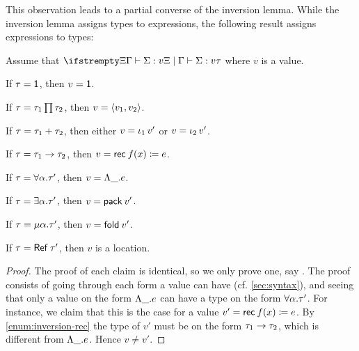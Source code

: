 This observation leads to a partial converse of the inversion lemma. While the inversion lemma assigns types to expressions, the following result assigns expressions to types:

\begin{lemma}
    \label{lem:canonical}
    Assume that $\typerel{\Xi}{\Gamma}{\Sigma}{v}{\tau}$ where $v$ is a value.
    \begin{enumlemma}[left=0.2cm] %
        \item\label{enum:canonical-unit} If $\tau = \mathsf{1}$, then $v = \mathsf{1}$.

        \item\label{enum:canonical-product} If $\tau = \typeProd{\tau_1}{\tau_2}$, then $v = \langle\textcolor{black}{v_1},\textcolor{black}{v_2}\rangle$.
        
        \item\label{enum:canonical-sum} If $\tau = \textcolor{black}{\tau_1} + \textcolor{black}{\tau_2}$, then either $v = \expInjl{v'}$ or $v = \expInjr{v'}$.

        \item\label{enum:canonical-function} If $\tau = \typeFunc{\tau_1}{\tau_2}$, then $v = \expRec{f}{x}{e}$.

        \item\label{enum:canonical-forall} If $\tau = \typeForall{\alpha}{\tau'}$, then $v = \expForall{\alpha}{e}$.

        \item\label{enum:canonical-exists} If $\tau = \typeExists{\alpha}{\tau'}$, then $v = \expPack{v'}$.

        \item\label{enum:canonical-recursive} If $\tau = \typeRec{\alpha}{\tau'}$, then $v = \expFold{v'}$.

        \item\label{enum:canonical-ref} If $\tau = \mathsf{Ref}\:\tau'$, then $v$ is a location.
    \end{enumlemma}
\end{lemma}

\begin{proof}
    The proof of each claim is identical, so we only prove one, say . The proof consists of going through each form a value can have (cf. \cref{sec:syntax}), and seeing that only a value on the form $\expForall{\alpha}{e}$ can have a type on the form $\typeForall{\alpha}{\tau'}$. For instance, we claim that this is the case for a value $v' = \expRec{f}{x}{e}$. By \cref{enum:inversion-rec} the type of $v'$ must be on the form $\typeFunc{\tau_1}{\tau_2}$, which is different from $\expForall{\alpha}{e}$. Hence $v \neq v'$.
\end{proof}


